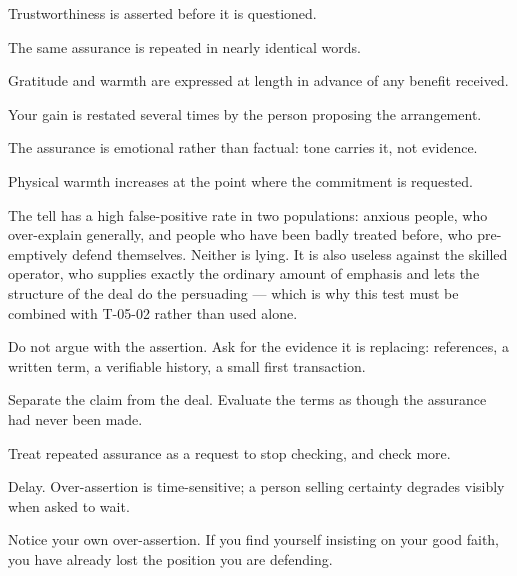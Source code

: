 \begin{feedback}
  \item Trustworthiness is asserted before it is questioned.
  \item The same assurance is repeated in nearly identical words.
  \item Gratitude and warmth are expressed at length in advance of any benefit received.
  \item Your gain is restated several times by the person proposing the arrangement.
  \item The assurance is emotional rather than factual: tone carries it, not evidence.
  \item Physical warmth increases at the point where the commitment is requested.
\end{feedback}

\begin{failure}
The tell has a high false-positive rate in two populations: anxious people, who over-explain generally, and people who have been badly treated before, who pre-emptively defend themselves. Neither is lying. It is also useless against the skilled operator, who supplies exactly the ordinary amount of emphasis and lets the structure of the deal do the persuading --- which is why this test must be combined with T-05-02 rather than used alone.
\end{failure}

\begin{countermeasures}
  \item Do not argue with the assertion. Ask for the evidence it is replacing: references, a written term, a verifiable history, a small first transaction.
  \item Separate the claim from the deal. Evaluate the terms as though the assurance had never been made.
  \item Treat repeated assurance as a request to stop checking, and check more.
  \item Delay. Over-assertion is time-sensitive; a person selling certainty degrades visibly when asked to wait.
  \item Notice your own over-assertion. If you find yourself insisting on your good faith, you have already lost the position you are defending.
\end{countermeasures}

\seesources
{}
